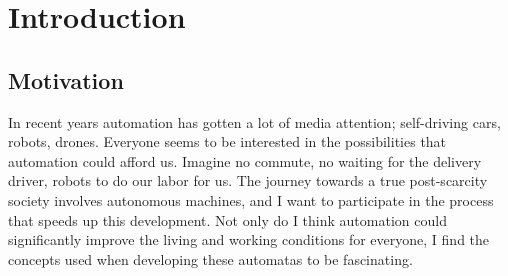 \blankpage
\section{Introduction}
\subsection{Motivation}

In recent years automation has gotten a lot of media attention; self-driving cars, robots, drones. Everyone seems to be interested in
the possibilities that automation could afford us. Imagine no commute, no waiting for the delivery driver, robots to do our labor
for us. The journey towards a true post-scarcity society involves autonomous machines, and I want to participate in the process that speeds
up this development. Not only do I think automation could significantly improve the living and working conditions for everyone, I find
the concepts used when developing these automatas to be fascinating.

